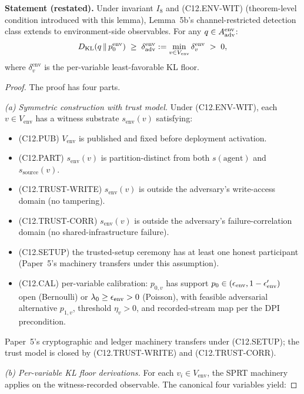 \textbf{Statement (restated).}  Under invariant $I_8$ and
(C12.ENV-WIT) (theorem-level condition introduced with this
lemma), Lemma~5b's channel-restricted detection class extends to
environment-side observables.  For any $q \in A_{\mathrm{adv}}^{\mathrm{env}}$:
\[
  D_{\mathrm{KL}}(q \,\|\, p_0^{\mathrm{env}}) \;\geq\;
  \delta_{\mathrm{adv}}^{\mathrm{env}} := \min_{v \in V_{\mathrm{env}}}
  \delta_v^{\mathrm{env}} \;>\; 0,
\]
where $\delta_v^{\mathrm{env}}$ is the per-variable least-favorable
KL floor.

\begin{proof}
The proof has four parts.

\emph{(a) Symmetric construction with trust model.}  Under
(C12.ENV-WIT), each $v \in V_{\mathrm{env}}$ has a witness substrate
$s_{\mathrm{env}}(v)$ satisfying:
\begin{itemize}
\item (C12.PUB) $V_{\mathrm{env}}$ is published and fixed before
  deployment activation.
\item (C12.PART) $s_{\mathrm{env}}(v)$ is partition-distinct from
  both $s(\mathrm{agent})$ and $s_{\mathrm{source}}(v)$.
\item (C12.TRUST-WRITE) $s_{\mathrm{env}}(v)$ is outside the
  adversary's write-access domain (no tampering).
\item (C12.TRUST-CORR) $s_{\mathrm{env}}(v)$ is outside the
  adversary's failure-correlation domain (no shared-infrastructure
  failure).
\item (C12.SETUP) the trusted-setup ceremony has at least one
  honest participant (Paper~5's machinery transfers under this
  assumption).
\item (C12.CAL) per-variable calibration: $p_{0, v}$ has support
  $p_0 \in (\epsilon_{\mathrm{env}}, 1 - \epsilon_{\mathrm{env}}')$ open (Bernoulli) or $\lambda_0 \geq
  \epsilon_{\mathrm{env}} > 0$ (Poisson), with feasible adversarial alternative
  $p_{1, v}$, threshold $\eta_v > 0$, and recorded-stream map per
  the DPI precondition.
\end{itemize}
Paper~5's cryptographic and ledger machinery transfers under
(C12.SETUP); the trust model is closed by (C12.TRUST-WRITE) and
(C12.TRUST-CORR).

\emph{(b) Per-variable KL floor derivations.}  For each $v_i \in
V_{\mathrm{env}}$, the SPRT machinery applies on the
witness-recorded observable.  The canonical four variables yield:


\end{proof}
